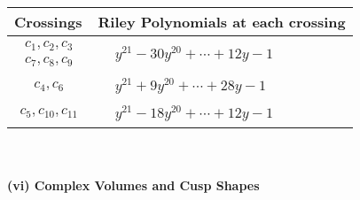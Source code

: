 \documentclass[1p]{elsarticle_modified}
\theoremstyle{definition}
\begin{document}
\begin{tabular}{m{50pt}|m{274pt}}
Crossings & \hspace{64pt}Riley Polynomials at each crossing \\
\hline $$\begin{aligned}c_{1},c_{2},c_{3}\\c_{7},c_{8},c_{9}\end{aligned}$$&$\begin{aligned}
&y^{21}-30 y^{20}+\cdots+12 y-1
\end{aligned}$\\
\hline $$\begin{aligned}c_{4},c_{6}\end{aligned}$$&$\begin{aligned}
&y^{21}+9 y^{20}+\cdots+28 y-1
\end{aligned}$\\
\hline $$\begin{aligned}c_{5},c_{10},c_{11}\end{aligned}$$&$\begin{aligned}
&y^{21}-18 y^{20}+\cdots+12 y-1
\end{aligned}$\\
\hline
\end{tabular}\\~\\
\newpage\flushleft \textbf{(vi) Complex Volumes and Cusp Shapes}
\end{document}
